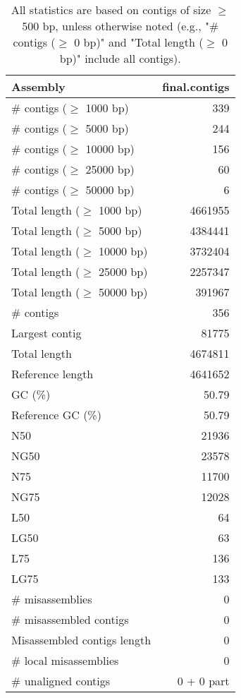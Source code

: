 \documentclass[12pt,a4paper]{article}
\begin{document}
\begin{table}[ht]
\begin{center}
\caption{All statistics are based on contigs of size $\geq$ 500 bp, unless otherwise noted (e.g., "\# contigs ($\geq$ 0 bp)" and "Total length ($\geq$ 0 bp)" include all contigs).}
\begin{tabular}{|l*{1}{|r}|}
\hline
Assembly & final.contigs \\ \hline
\# contigs ($\geq$ 1000 bp) & 339 \\ \hline
\# contigs ($\geq$ 5000 bp) & 244 \\ \hline
\# contigs ($\geq$ 10000 bp) & 156 \\ \hline
\# contigs ($\geq$ 25000 bp) & 60 \\ \hline
\# contigs ($\geq$ 50000 bp) & 6 \\ \hline
Total length ($\geq$ 1000 bp) & 4661955 \\ \hline
Total length ($\geq$ 5000 bp) & 4384441 \\ \hline
Total length ($\geq$ 10000 bp) & 3732404 \\ \hline
Total length ($\geq$ 25000 bp) & 2257347 \\ \hline
Total length ($\geq$ 50000 bp) & 391967 \\ \hline
\# contigs & 356 \\ \hline
Largest contig & 81775 \\ \hline
Total length & 4674811 \\ \hline
Reference length & 4641652 \\ \hline
GC (\%) & 50.79 \\ \hline
Reference GC (\%) & 50.79 \\ \hline
N50 & 21936 \\ \hline
NG50 & 23578 \\ \hline
N75 & 11700 \\ \hline
NG75 & 12028 \\ \hline
L50 & 64 \\ \hline
LG50 & 63 \\ \hline
L75 & 136 \\ \hline
LG75 & 133 \\ \hline
\# misassemblies & 0 \\ \hline
\# misassembled contigs & 0 \\ \hline
Misassembled contigs length & 0 \\ \hline
\# local misassemblies & 0 \\ \hline
\# unaligned contigs & 0 + 0 part \\ \hline

\end{tabular}
\end{center}
\end{table}
\end{document}
